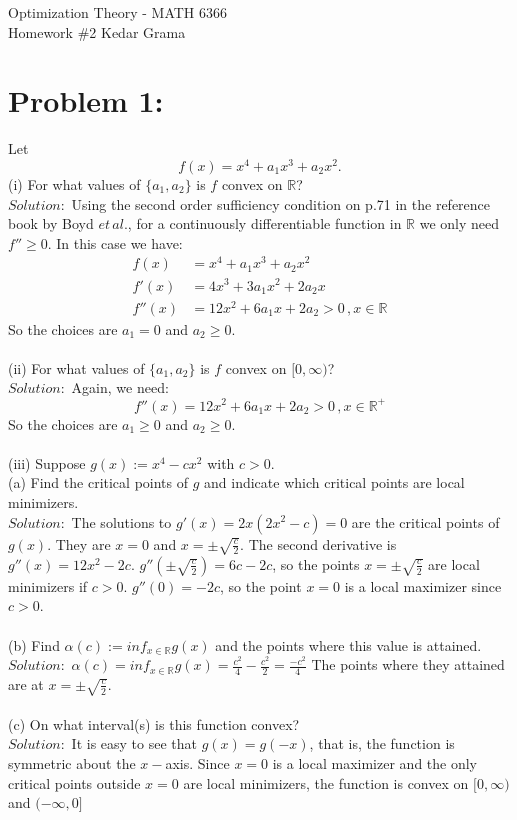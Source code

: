 \documentclass[12pt]{report}
\begin{document}
\begin{center}
	\large{Optimization Theory - MATH 6366}\\
	\hfill \hfill \large{Homework \#2} \hfill \large{Kedar Grama}\\
\end{center}

\section*{Problem 1:}
Let $$f (x) = x^4 + a_1 x^3 + a_2 x^2 .$$
(i) For what values of $\{a_1 , a_2 \}$ is $f$ convex on $\mathbb{R}$?\\
$Solution:$ Using the second order sufficiency condition on p.71 in the reference book
by Boyd $et\, al.$, for a continuously differentiable function in $\mathbb{R}$ we only need
$f'' ≥ 0$. In this case we have:
\begin{align*}
f (x) &= x^4 + a_1 x^3 + a_2 x^2\\
f'(x) &= 4x^3 + 3a_1 x^2 + 2a_2 x\\
f''(x) &= 12x^2 + 6a_1 x + 2a_2 > 0 \, , x \in \mathbb{R}
\end{align*}
So the choices are $a_1=0$ and $a_2\geq0$.\\
\\
(ii) For what values of $\{a_1 , a_2 \}$ is $f$ convex on $[0, \infty)$?\\
$Solution:$ Again, we need:
$$f''(x) = 12x^2 + 6a_1 x + 2a_2 > 0 \, , x \in \mathbb{R}^+$$
So the choices are $a_1\geq0$ and $a_2\geq0$.\\
\\
(iii) Suppose $g(x) := x^4 - c x^2$ with $c > 0$.\\
(a) Find the critical points of $g$ and indicate which critical points are local
minimizers.\\
$Solution:$ The solutions to $g'(x) = 2x(2x^2 - c )=0$  are the critical points of $g(x)$.
They are $x=0$ and $x= \pm \sqrt{\frac{c}{2}} $. The second derivative is\\
$g''(x) = 12x^2 - 2c $. $g''(\pm \sqrt{\frac{c}{2}})=6c-2c$, so the points
$x=\pm \sqrt{\frac{c}{2}}$ are local minimizers if $c>0$. $g''(0)=-2c$, so the point $x=0$
is a local maximizer since $c>0$.\\
\\
(b) Find $\alpha(c) := inf_{x \in \mathbb{R}} g(x)$ and the points where this value is
attained.\\
$Solution:$ $\alpha(c) = inf_{x \in \mathbb{R}} g(x) = \frac{c^2}{4} - \frac{c^2}{2}=
\frac{-c^2}{4}$ The points where they attained are at $x= \pm \sqrt{\frac{c}{2}} $.\\
\\
(c) On what interval(s) is this function convex?\\
$Solution:$ It is easy to see that $g(x)=g(-x)$, that is, the function is symmetric about the
$x-$axis. Since $x=0$ is a local maximizer and the only critical points outside $x=0$ are
local minimizers, the function is convex on $[0,\infty)$ and $(-\infty,0]$ \\
\end{document}
